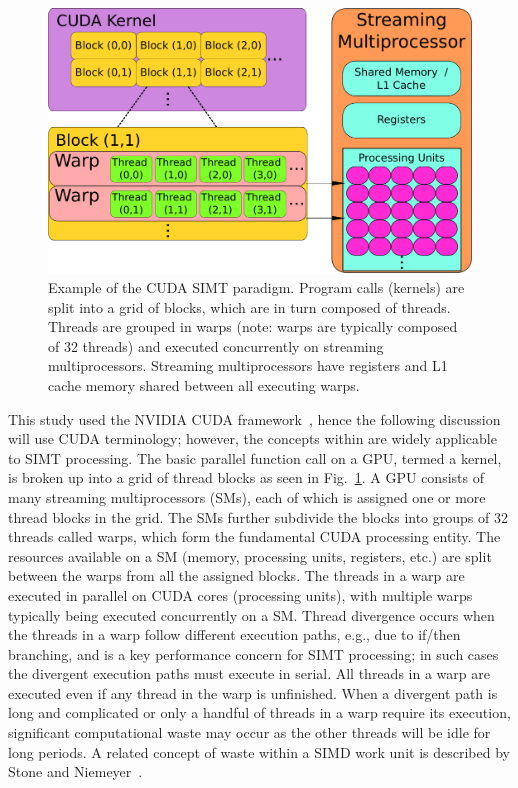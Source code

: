 \documentclass[preprint,review,11pt]{elsarticle}
\begin{document}
\begin{figure}[htbp]
  \centering
  \includegraphics[width=0.5\linewidth]{cuda_paradigm.pdf}
  \caption{Example of the CUDA SIMT paradigm.
  Program calls (kernels) are split into a grid of blocks, which are in turn composed of threads.
  Threads are grouped in warps (note: warps are typically composed of 32 threads) and executed concurrently on streaming multiprocessors.
  Streaming multiprocessors have registers and L1 cache memory shared between all executing warps.}
  \label{F:cuda}
\end{figure}

This study used the NVIDIA CUDA framework~\cite{Buck:2008aa,NVIDIA:2015aa}, hence the following discussion will use CUDA terminology; however, the concepts within are widely applicable to SIMT processing.
The basic parallel function call on a GPU, termed a kernel, is broken up into a grid of thread blocks as seen in Fig.~\ref{F:cuda}.
A GPU consists of many streaming multiprocessors (SMs), each of which is assigned one or more thread blocks in the grid.
The SMs further subdivide the blocks into groups of \num{32} threads called warps, which form the fundamental CUDA processing entity.
The resources available on a SM (memory, processing units, registers, etc.) are split between the warps from all the assigned blocks.
The threads in a warp are executed in parallel on CUDA cores (processing units), with multiple warps typically being executed concurrently on a SM.
Thread divergence occurs when the threads in a warp follow different execution paths, e.g., due to if\slash then branching, and is a key performance concern for SIMT processing; in such cases the divergent execution paths must execute in serial.
All threads in a warp are executed even if any thread in the warp is unfinished.
When a divergent path is long and complicated or only a handful of threads in a warp require its execution, significant computational waste may occur as the other threads will be idle for long periods.
A related concept of waste within a SIMD work unit is described by Stone and Niemeyer~\cite{2016arXiv160805794S}.
\end{document}
